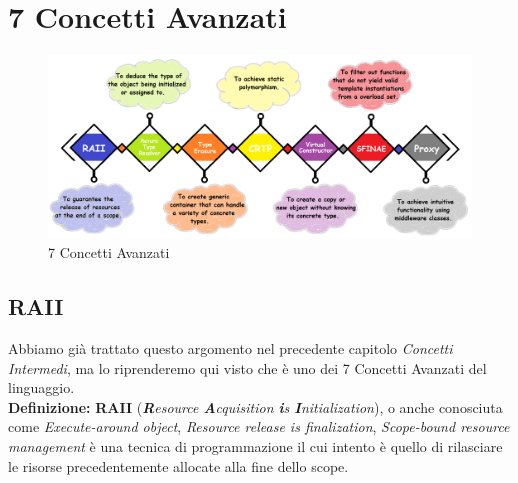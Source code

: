 \newpage




\section{7 Concetti Avanzati}

\begin{figure}[H]
	\centering
	\includegraphics[width=1.2\textwidth, height=1.2\textheight, keepaspectratio]{./imgs/7-Advanced-C-programming-styles-and-idiom-examples-you-should-know.png}
	\caption{7 Concetti Avanzati}
	\label{fig:7-Advanced-C-programming-styles-and-idiom-examples-you-should-know}
\end{figure}

\subsection{RAII}

\textsf{\small Abbiamo già trattato questo argomento nel precedente capitolo \emph{Concetti Intermedi}, ma lo riprenderemo qui visto che è uno dei 7 Concetti Avanzati del linguaggio.} \\

\textsf{\small \textbf{Definizione: } \textbf{RAII} (\emph{\textbf{R}esource \textbf{A}cquisition \textbf{i}s \textbf{I}nitialization}), o anche conosciuta come \emph{Execute-around object}, \emph{Resource release is finalization}, \emph{Scope-bound resource management} è una tecnica di programmazione il cui intento è quello di rilasciare le risorse precedentemente allocate alla fine dello scope. } \\

